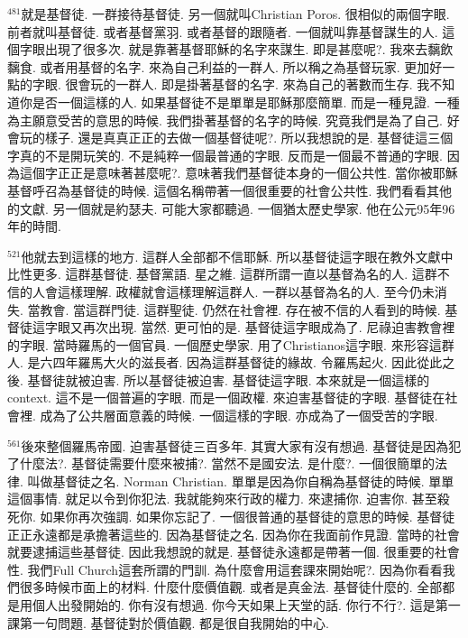 \documentclass{book}
\begin{document}
$^{481}$就是基督徒.
一群接待基督徒.
另一個就叫Christian Poros.
很相似的兩個字眼.
前者就叫基督徒.
或者基督黨羽.
或者基督的跟隨者.
一個就叫靠基督謀生的人.
這個字眼出現了很多次.
就是靠著基督耶穌的名字來謀生.
即是甚麼呢?.
我來去黐飲黐食.
或者用基督的名字.
來為自己利益的一群人.
所以稱之為基督玩家.
更加好一點的字眼.
很會玩的一群人.
即是掛著基督的名字.
來為自己的著數而生存.
我不知道你是否一個這樣的人.
如果基督徒不是單單是耶穌那麼簡單.
而是一種見證.
一種為主願意受苦的意思的時候.
我們掛著基督的名字的時候.
究竟我們是為了自己.
好會玩的樣子.
還是真真正正的去做一個基督徒呢?.
所以我想說的是.
基督徒這三個字真的不是開玩笑的.
不是純粹一個最普通的字眼.
反而是一個最不普通的字眼.
因為這個字正正是意味著甚麼呢?.
意味著我們基督徒本身的一個公共性.
當你被耶穌基督呼召為基督徒的時候.
這個名稱帶著一個很重要的社會公共性.
我們看看其他的文獻.
另一個就是約瑟夫.
可能大家都聽過.
一個猶太歷史學家.
他在公元95年96年的時間.

$^{521}$他就去到這樣的地方.
這群人全部都不信耶穌.
所以基督徒這字眼在教外文獻中比性更多.
這群基督徒.
基督黨語.
星之維.
這群所謂一直以基督為名的人.
這群不信的人會這樣理解.
政權就會這樣理解這群人.
一群以基督為名的人.
至今仍未消失.
當教會.
當這群門徒.
這群聖徒.
仍然在社會裡.
存在被不信的人看到的時候.
基督徒這字眼又再次出現.
當然.
更可怕的是.
基督徒這字眼成為了.
尼祿迫害教會裡的字眼.
當時羅馬的一個官員.
一個歷史學家.
用了Christianos這字眼.
來形容這群人.
是六四年羅馬大火的滋長者.
因為這群基督徒的緣故.
令羅馬起火.
因此從此之後.
基督徒就被迫害.
所以基督徒被迫害.
基督徒這字眼.
本來就是一個這樣的context.
這不是一個普遍的字眼.
而是一個政權.
來迫害基督徒的字眼.
基督徒在社會裡.
成為了公共層面意義的時候.
一個這樣的字眼.
亦成為了一個受苦的字眼.

$^{561}$後來整個羅馬帝國.
迫害基督徒三百多年.
其實大家有沒有想過.
基督徒是因為犯了什麼法?.
基督徒需要什麼來被捕?.
當然不是國安法.
是什麼?.
一個很簡單的法律.
叫做基督徒之名.
Norman Christian.
單單是因為你自稱為基督徒的時候.
單單這個事情.
就足以令到你犯法.
我就能夠來行政的權力.
來逮捕你.
迫害你.
甚至殺死你.
如果你再次強調.
如果你忘記了.
一個很普通的基督徒的意思的時候.
基督徒正正永遠都是承擔著這些的.
因為基督徒之名.
因為你在我面前作見證.
當時的社會就要逮捕這些基督徒.
因此我想說的就是.
基督徒永遠都是帶著一個.
很重要的社會性.
我們Full Church這套所謂的門訓.
為什麼會用這套課來開始呢?.
因為你看看我們很多時候市面上的材料.
什麼什麼價值觀.
或者是真金法.
基督徒什麼的.
全部都是用個人出發開始的.
你有沒有想過.
你今天如果上天堂的話.
你行不行?.
這是第一課第一句問題.
基督徒對於價值觀.
都是很自我開始的中心.
\end{document}

